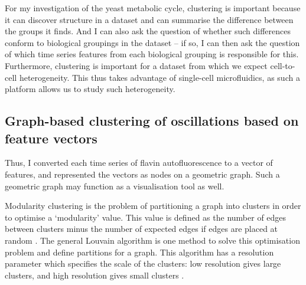 For my investigation of the yeast metabolic cycle, clustering is important because it can discover structure in a dataset and can summarise the difference between the groups it finds.
And I can also ask the question of whether such differences conform to biological groupings in the dataset -- if so, I can then ask the question of which time series features from each biological grouping is responsible for this.
Furthermore, clustering is important for a dataset from which we expect cell-to-cell heterogeneity.
This thus takes advantage of single-cell microfluidics, as such a platform allows us to study such heterogeneity.


\subsection{Graph-based clustering of oscillations based on feature vectors}
\label{subsec:analysis-clustering-graphclustering}

Thus, I converted each time series of flavin autofluorescence to a vector of features, and represented the vectors as nodes on a geometric graph.
Such a geometric graph may function as a visualisation tool as well.


Modularity clustering is the problem of partitioning a graph into clusters in order to optimise a `modularity' value.
This value is defined as the number of edges between clusters minus the number of expected edges if edges are placed at random \parencite{newmanModularityCommunityStructure2006}.
The general Louvain algorithm \parencite{blondelFastUnfoldingCommunities2008,muchaCommunityStructureTimeDependent2010} is one method to solve this optimisation problem and define partitions for a graph.
This algorithm has a resolution parameter which specifies the scale of the clusters: low resolution gives large clusters, and high resolution gives small clusters \parencite{fortunatoResolutionLimitCommunity2007}.

